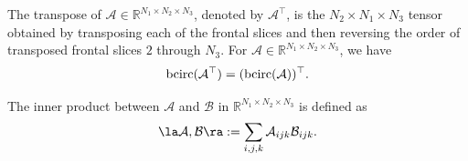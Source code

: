 \documentclass[aspectratio=169]{beamer}
\def\bcirc{{\rm bcirc}}
\def\mcala{\mathcal A}
\def\mcalb{\mathcal B}
\def\mbbr{\mathbb R}
\newcommand{\beq}{\begin{equation}}\newcommand{\eeq}{\end{equation}}
\begin{document}
\begin{frame}{}
\begin{definition}[transpose]
The transpose of $\mcala\in\mbbr^{N_1\times N_2\times N_3}$, denoted by $\mcala^\top$, is the $N_2\times N_1\times N_3$ tensor obtained by transposing each of the frontal slices and then reversing the order of transposed frontal slices $2$ through $N_3$.
For $\mcala\in\mbbr^{N_1\times N_2\times N_3}$, we have  \beq\label{ttop}\bcirc(\mcala^\top)=(\bcirc(\mcala))^\top.\eeq %
\end{definition}
\begin{definition}
The inner product between $\mcala$ and $\mcalb$ in $\mbbr^{N_1\times N_2\times N_3}$ is defined as $$\la\mcala,\mcalb\ra:=\sum_{i,j,k}\mcala_{ijk}\mcalb_{ijk}.$$ 
\end{definition}
\end{frame}
\end{document}
